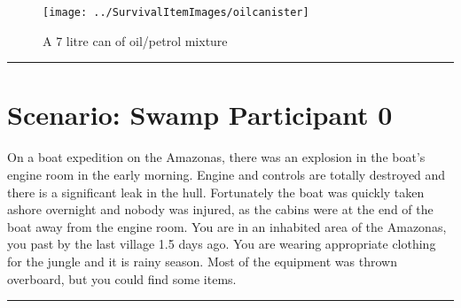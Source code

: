 \documentclass{article}
\begin{document}
    \begin{figure}[H]
        \centering
        \begin{minipage}{0.25\textwidth}
            \centering
            \texttt{[image: ../SurvivalItemImages/oilcanister]}
        \end{minipage}\hfill
        \begin{minipage}{0.7\textwidth}
            \centering
            \Large A 7 litre can of oil/petrol mixture
        \end{minipage}
    \end{figure}
    \vspace{-0.8em}
    \noindent\rule{\textwidth}{0.4pt}
            
    \clearpage
    \section*{Scenario: \textmd{Swamp} \hfill Participant \textmd{0}}
    \Large On a boat expedition on the Amazonas, there was an explosion in the boat's engine room in the early morning. Engine and controls are totally destroyed and there is a significant leak in the hull. Fortunately the boat was quickly taken ashore overnight and nobody was injured, as the cabins were at the end of the boat away from the engine room. You are in an inhabited area of the Amazonas, you past by the last village 1.5 days ago. You are wearing appropriate clothing for the jungle and it is rainy season. Most of the equipment was thrown overboard, but you could find some items.\clearpage
        \par\noindent\rule{\textwidth}{0.4pt}
\end{document}
